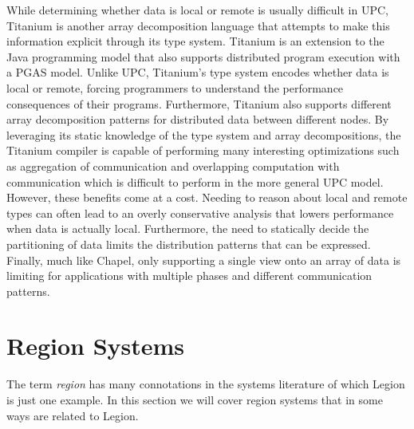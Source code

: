 While determining whether data is local or remote is
usually difficult in UPC, Titanium\cite{Titanium98} is 
another array decomposition language that attempts to 
make this information explicit through its type system.
Titanium is an extension to the Java programming model
that also supports distributed program execution with
a PGAS model.  Unlike UPC, Titanium's type system encodes
whether data is local or remote, forcing programmers
to understand the performance consequences of their
programs. Furthermore, Titanium also supports different
array decomposition patterns for distributed data between
different nodes. By leveraging its static knowledge of
the type system and array decompositions, the Titanium
compiler is capable of performing many interesting
optimizations such as aggregation of communication
and overlapping computation with communication which
is difficult to perform in the more general UPC model.
However, these benefits come at a cost.  Needing to 
reason about local and remote types can often lead to
an overly conservative analysis that lowers performance
when data is actually local. Furthermore, the need to
statically decide the partitioning of data limits the
distribution patterns that can be expressed. Finally,
much like Chapel, only supporting a single view onto
an array of data is limiting for applications with
multiple phases and different communication patterns.

\section{Region Systems}
\label{sec:regionsys}

The term {\em region} has many connotations in the 
systems literature of which Legion is just
one example. In this section we will cover 
region systems that in some ways are related to Legion.

